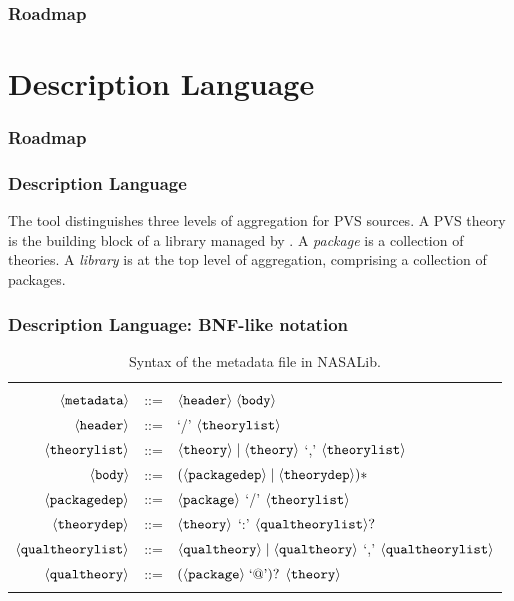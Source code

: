 \documentclass[mathserif,fleqn]{beamer}
\begin{document}
\begin{frame}
  \frametitle{Roadmap}
  \tableofcontents
\end{frame}

\section{Description Language}

\begin{frame}
  \frametitle{Roadmap} 
  \tableofcontents[currentsection]
\end{frame}

\begin{frame}
  \frametitle{Description Language}

The  tool distinguishes three levels of aggregation for PVS
sources. A PVS theory is the building block of a library managed by
. A {\em package} is a collection of theories.  A {\em
  library} is at the top level of aggregation, comprising a collection
of packages.

\end{frame}

\begin{frame}
  \frametitle{Description Language: BNF-like notation}
  
    \begin{table}
    \begin{tabular}{r c p{6cm}}
      \hline \\
      $\langle{\textnormal{\texttt{metadata}}}\rangle$ & ::= & $\langle{\textnormal{\texttt{header}}}\rangle \; \langle{\textnormal{\texttt{body}}}\rangle$ \\
      $\langle{\textnormal{\texttt{header}}}\rangle$ & ::= & `/' $\langle{\textnormal{\texttt{theorylist}}}\rangle$ \\
      $\langle{\textnormal{\texttt{theorylist}}}\rangle$ & ::= & $\langle{\textnormal{\texttt{theory}}}\rangle \mid \langle{\textnormal{\texttt{theory}}}\rangle$ `,' $\langle{\textnormal{\texttt{theorylist}}}\rangle$ \\
      $\langle{\textnormal{\texttt{body}}}\rangle$ & ::= & $(\langle{\textnormal{\texttt{packagedep}}}\rangle \mid \langle{\textnormal{\texttt{theorydep}}}\rangle)*$ \\
      $\langle{\textnormal{\texttt{packagedep}}}\rangle$ & ::= & $\langle{\textnormal{\texttt{package}}}\rangle$ `/' $\langle{\textnormal{\texttt{theorylist}}}\rangle$ \\
      $\langle{\textnormal{\texttt{theorydep}}}\rangle$ & ::= & $\langle{\textnormal{\texttt{theory}}}\rangle$ `:' $\langle{\textnormal{\texttt{qualtheorylist}}}\rangle ?$ \\
      $\langle{\textnormal{\texttt{qualtheorylist}}}\rangle$ & ::= & $\langle{\textnormal{\texttt{qualtheory}}}\rangle \mid \langle{\textnormal{\texttt{qualtheory}}}\rangle$ `,' $\langle{\textnormal{\texttt{qualtheorylist}}}\rangle$ \\
      $\langle{\textnormal{\texttt{qualtheory}}}\rangle$ & ::= & $(\langle{\textnormal{\texttt{package}}}\rangle\; \text{`@'})?$ $\langle{\textnormal{\texttt{theory}}}\rangle$ \\
      \\
      \hline
    \end{tabular}
    \caption{Syntax of the  metadata file in NASALib.}
  \end{table}
  
\end{frame}
\end{document}
